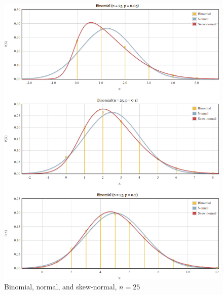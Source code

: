 \documentclass{article}
\begin{document}
\begin{figure}
  \centering
  \includegraphics[width=\textwidth]{../images/comparison-n25.png}
  \caption{Binomial, normal, and skew-normal, $n=25$}
  \label{fig:comparison-n25}
\end{figure}
\end{document}
